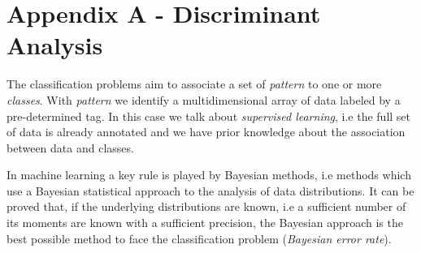 \documentclass{standalone}
\begin{document}
\chapter*{Appendix A - Discriminant Analysis}

The classification problems aim to associate a set of \emph{pattern} to one or more \emph{classes}.
With \emph{pattern} we identify a multidimensional array of data labeled by a pre-determined tag.
In this case we talk about \emph{supervised learning}, i.e the full set of data is already annotated and we have prior knowledge about the association between data and classes.

In machine learning a key rule is played by Bayesian methods, i.e methods which use a Bayesian statistical approach to the analysis of data distributions.
It can be proved that, if the underlying distributions are known, i.e a sufficient number of its moments are known with a sufficient precision, the Bayesian approach is the best possible method to face the classification problem (\emph{Bayesian error rate}\cite{Fukunaga:1990:ISP:92131}).
\end{document}
